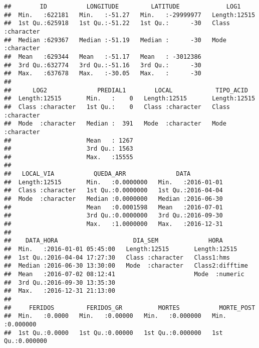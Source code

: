 \documentclass[]{article}
\begin{document}
\begin{verbatim}
##        ID           LONGITUDE         LATITUDE             LOG1          
##  Min.   :622181   Min.   :-51.27   Min.   :-29999977   Length:12515      
##  1st Qu.:625918   1st Qu.:-51.22   1st Qu.:      -30   Class :character  
##  Median :629367   Median :-51.19   Median :      -30   Mode  :character  
##  Mean   :629344   Mean   :-51.17   Mean   : -3012386                     
##  3rd Qu.:632774   3rd Qu.:-51.16   3rd Qu.:      -30                     
##  Max.   :637678   Max.   :-30.05   Max.   :      -30                     
##                                                                          
##      LOG2              PREDIAL1        LOCAL            TIPO_ACID        
##  Length:12515       Min.   :    0   Length:12515       Length:12515      
##  Class :character   1st Qu.:    0   Class :character   Class :character  
##  Mode  :character   Median :  391   Mode  :character   Mode  :character  
##                     Mean   : 1267                                        
##                     3rd Qu.: 1563                                        
##                     Max.   :15555                                        
##                                                                          
##   LOCAL_VIA           QUEDA_ARR              DATA           
##  Length:12515       Min.   :0.0000000   Min.   :2016-01-01  
##  Class :character   1st Qu.:0.0000000   1st Qu.:2016-04-04  
##  Mode  :character   Median :0.0000000   Median :2016-06-30  
##                     Mean   :0.0001598   Mean   :2016-07-01  
##                     3rd Qu.:0.0000000   3rd Qu.:2016-09-30  
##                     Max.   :1.0000000   Max.   :2016-12-31  
##                                                             
##    DATA_HORA                     DIA_SEM              HORA         
##  Min.   :2016-01-01 05:45:00   Length:12515       Length:12515     
##  1st Qu.:2016-04-04 17:27:30   Class :character   Class1:hms       
##  Median :2016-06-30 13:30:00   Mode  :character   Class2:difftime  
##  Mean   :2016-07-02 08:12:41                      Mode  :numeric   
##  3rd Qu.:2016-09-30 13:35:30                                       
##  Max.   :2016-12-31 21:13:00                                       
##                                                                    
##     FERIDOS         FERIDOS_GR          MORTES           MORTE_POST      
##  Min.   :0.0000   Min.   :0.00000   Min.   :0.000000   Min.   :0.000000  
##  1st Qu.:0.0000   1st Qu.:0.00000   1st Qu.:0.000000   1st Qu.:0.000000  

\end{verbatim}
\end{document}
